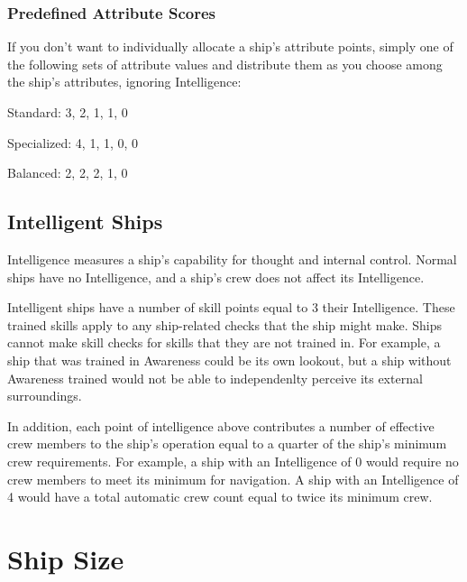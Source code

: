         \subsubsection{Predefined Attribute Scores}
            If you don't want to individually allocate a ship's attribute points, simply one of the following sets of attribute values and distribute them as you choose among the ship's attributes, ignoring Intelligence:
            \begin{raggeditemize}
                \item Standard: 3, 2, 1, 1, 0
                \item Specialized: 4, 1, 1, 0, 0
                \item Balanced: 2, 2, 2, 1, 0
            \end{raggeditemize}

    \subsection{Intelligent Ships}
        Intelligence measures a ship's capability for thought and internal control.
        Normal ships have no Intelligence, and a ship's crew does not affect its Intelligence.

        Intelligent ships have a number of skill points equal to 3 \add their Intelligence.
        These trained skills apply to any ship-related checks that the ship might make.
        Ships cannot make skill checks for skills that they are not trained in.
        For example, a ship that was trained in Awareness could be its own lookout, but a ship without Awareness trained would not be able to independenlty perceive its external surroundings.

        In addition, each point of intelligence above  contributes a number of effective crew members to the ship's operation equal to a quarter of the ship's minimum crew requirements.
        For example, a ship with an Intelligence of 0 would require no crew members to meet its minimum for navigation.
        A ship with an Intelligence of 4 would have a total automatic crew count equal to twice its minimum crew.

\section{Ship Size}\label{Ship Size}


